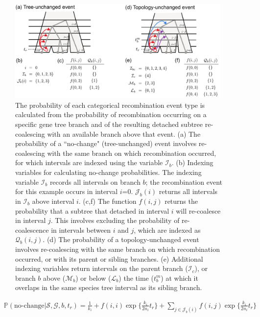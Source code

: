 \documentclass[11pt]{article}
\begin{document}
\begin{figure}[t]
	\centering
	\includegraphics[width=0.99\textwidth]{figures/current/Fig3-interval-functions.pdf}
	\caption{
		The probability of each categorical
		recombination event type is calculated from the probability
		of recombination occurring on a specific gene tree branch and of
		the resulting detached subtree re-coalescing with an available
		branch above that event.
		(a) The probability of a ``no-change" (tree-unchanged) event involves
		re-coalescing with the same branch on which recombination occurred,
		for which intervals are indexed using the variable $\mathcal{I}_b$.
		(b) Indexing variables for calculating 
		no-change probabilities. The indexing variable $\mathcal{I}_b$ records all
		intervals on branch $b$; the recombination event for this example 
		occurs in interval $i$=0.
		$\mathcal{J}_b(i)$ returns all intervals in $\mathcal{I}_b$ above interval $i$.
		(c,f) The function $f(i,j)$ returns the probability that a subtree that detached 
		in interval $i$ will re-coalesce in interval $j$. This involves excluding
		the probability of re-coalescence in intervals between $i$ and $j$, which are 
		indexed as $\mathcal{Q}_b(i,j)$. 
		(d) The probability of a topology-unchanged event involves re-coalescing with the 
		same branch on which recombination occurred, or with its parent or sibling branches. 
		(e) Additional indexing variables return intervals on the parent branch 
		($\mathcal{I}_c$), or branch $b$ above ($\mathcal{M}_b$) or below 
		($\mathcal{L}_b$) the time ($t_b^m$) at which it overlaps in the same species tree interval 
		as its sibling branch.
	}
	\label{fig:fig3}
\end{figure}


\begin{equation}
\begin{aligned}
	&\mathbb{P}(\text{no-change} | \mathcal{S},\mathcal{G},b,t_r) = 
	\frac{1}{k_i} + 
	f(i,i) \exp \bigg\{ \frac{k_i}{2n_i} t_r \bigg\} +
	\sum_{j \in \mathcal{J}_b(i)} f(i,j) \exp \bigg\{ \frac{k_i}{2n_i} t_r\bigg\}
\end{aligned}
\end{equation}
\end{document}
